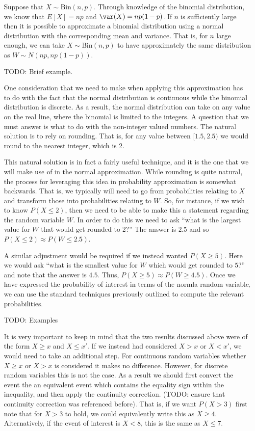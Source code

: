 \documentclass[
  letterpaper,
  DIV=11,
  numbers=noendperiod]{scrreprt}
\begin{document}
Suppose that \(X\sim\text{Bin}(n,p)\). Through knowledge of the binomial
distribution, we know that \(E[X] = np\) and \(\var(X) = np(1-p)\). If
\(n\) is sufficiently large then it is possible to approximate a
binomial distribution using a normal distribution with the corresponding
mean and variance. That is, for \(n\) large enough, we can take
\(X\sim\text{Bin}(n,p)\) to have approximately the same distribution as
\(W\sim N(np, np(1-p))\).

TODO: Brief example.

One consideration that we need to make when applying this approximation
has to do with the fact that the normal distribution is continuous while
the binomial distribution is discrete. As a result, the normal
distribution can take on any value on the real line, where the binomial
is limited to the integers. A question that we must answer is what to do
with the non-integer valued numbers. The natural solution is to rely on
rounding. That is, for any value between \([1.5, 2.5)\) we would round
to the nearest integer, which is \(2\).

This natural solution is in fact a fairly useful technique, and it is
the one that we will make use of in the normal approximation. While
rounding is quite natural, the process for leveraging this idea in
probability approximation is somewhat backwards. That is, we typically
will need to go from probabilities relating to \(X\) and transform those
into probabilities relating to \(W\). So, for instance, if we wish to
know \(P(X \leq 2)\), then we need to be able to make this a statement
regarding the random variable \(W\). In order to do this we need to ask
``what is the largest value for \(W\) that would get rounded to \(2\)?''
The answer is \(2.5\) and so \(P(X \leq 2) \approx P(W \leq 2.5)\).

A similar adjustment would be required if we instead wanted
\(P(X \geq 5)\). Here we would ask ``what is the smallest value for
\(W\) which would get rounded to \(5\)?'' and note that the answer is
\(4.5\). Thus, \(P(X \geq 5) \approx P(W \geq 4.5)\). Once we have
expressed the probability of interest in terms of the normla random
variable, we can use the standard techniques previously outlined to
compute the relevant probabilities.

TODO: Examples

It is very important to keep in mind that the two results discussed
above were of the form \(X \geq x\) and \(X \leq x'\). If we instead had
considered \(X > x\) or \(X < x'\), we would need to take an additional
step. For continuous random variables whether \(X \geq x\) or \(X > x\)
is considered it makes no difference. However, for discrete random
variables this is not the case. As a result we should first convert the
event the an equivalent event which contains the equality sign within
the inequality, and then apply the continuity correction. (TODO: ensure
that continuity correction was referenced before). That is, if we want
\(P(X > 3)\) first note that for \(X > 3\) to hold, we could
equivalently write this as \(X \geq 4\). Alternatively, if the event of
interest is \(X < 8\), this is the same as \(X \leq 7\).
\end{document}
